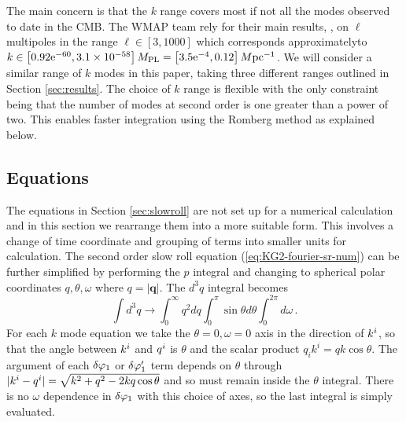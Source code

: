 The main concern is that the $k$ range covers most if not all the modes observed
to date in the CMB. The WMAP team rely for their main results,
\cite{Komatsu:2008hk},  
 on $\ell$ multipoles in the range $\ell \in [3, 1000]$
which corresponds approximately\footnotemark  to $k\in \left[0.92 \mathrm{e}^{{-60}}, 3.1 \times
10^{-58}\right]M_{\mathrm{PL}} = \left[3.5\mathrm{e}^{{-4}}, 0.12\right] M \mathrm{pc}^{-1}$.
We will consider a similar range of $k$ modes in this paper, taking three
different ranges outlined in Section \ref{sec:results}. The
choice of $k$ range is flexible with the only constraint being that the number
of modes at second order is one greater than a power of two. This enables faster
integration using the Romberg method as explained below. 




\subsection{Equations}
\label{sec:numeqs}


The equations in Section \ref{sec:slowroll} are not set up for a
numerical calculation and in this section we rearrange them into a more
suitable form. This involves a change of time coordinate and grouping of terms
into smaller units for calculation.
The second order slow roll equation (\ref{eq:KG2-fourier-sr-num}) can be further
simplified by performing the $p$
integral and changing to spherical polar coordinates $q, \theta, \omega$ where
$q=|\textbf{q}|$. The $d^3q$ integral becomes
% 
\begin{equation}
 \int d^3q \longrightarrow \int_{0}^{\infty} q^2 dq \int_{0}^{\pi}\sin \theta
d\theta 
   \int_{0}^{2\pi}d\omega \,.
\end{equation}
% 
For each $k$ mode equation we take the $\theta=0, \omega=0$ axis in the
direction of $k^i$, so that the angle between $k^i$ and $q^i$ is
$\theta$ and the scalar product $q_i k^i = q k \cos\theta$. 
The argument of
each $\delta\varphi_{1}$ or $\delta\varphi_{1}'$ term depends on $\theta$ through
$|k^i-q^i|=\sqrt{k^2 + q^2 -2kq \cos\theta}$ and
so must remain inside the $\theta$ integral. There is no $\omega$ dependence
in $\delta\varphi_{1}$ with this choice of axes, so the last integral is simply evaluated.

